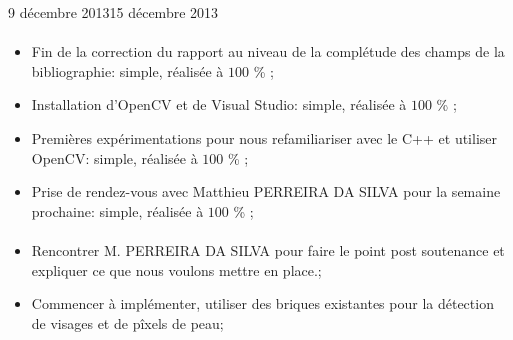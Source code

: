 \documentclass[11pt, french,screen]{report-rd-info}
\begin{document}
\begin{fichesuivi}{9 décembre 2013}{15 décembre 2013}
\paragraph{}
	\begin{travaileffectue}
		\begin{itemize}
			\item Fin de la correction du rapport au niveau de la complétude des champs de la bibliographie:  simple, réalisée à $100$ \% ;
			\item Installation d’OpenCV et de Visual Studio: simple, réalisée à $100$ \% ;
			\item Premières expérimentations pour nous refamiliariser avec le C++ et utiliser OpenCV: simple, réalisée à $100$ \% ;
			\item Prise de rendez-vous avec Matthieu PERREIRA DA SILVA pour la semaine prochaine:  simple, réalisée à $100$ \% ;
		\end{itemize}
	\end{travaileffectue}

\paragraph*{}
	\begin{planification}
		\begin{itemize}
			\item Rencontrer M. PERREIRA DA SILVA pour faire le point post soutenance et expliquer ce que nous voulons mettre en place.;
			\item Commencer à implémenter, utiliser des briques existantes pour la détection de visages et de pîxels de peau;
		\end{itemize}
	\end{planification}
\end{fichesuivi}
\end{document}
